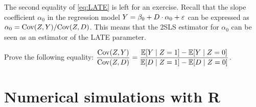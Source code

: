 \documentclass[11pt, A4paper, openany, uplatex]{book}
\begin{document}
The second equality of \eqref{eq:LATE} is left for an exercise.
Recall that the slope coefficient $\alpha_0$ in the regression model $Y = \beta_0 + D \cdot \alpha_0 + \varepsilon$ can be expressed as $\alpha_0 = \mathrm{Cov}(Z, Y)/\mathrm{Cov}(Z, D)$.
This means that the 2SLS estimator for $\alpha_0$ can be seen as an estimator of the LATE parameter.

\begin{framed}
\begin{exercise}\upshape
	Prove the following equality: $\displaystyle \frac{\mathrm{Cov}(Z, Y)}{\mathrm{Cov}(Z, D)} = \frac{\mathbb{E}[Y \mid Z = 1] - \mathbb{E}[Y \mid Z = 0]}{\mathbb{E}[D \mid Z = 1] - \mathbb{E}[D \mid Z = 0]}$.
\end{exercise}
\end{framed}

\section{Numerical simulations with \textbf{R}}
\end{document}
